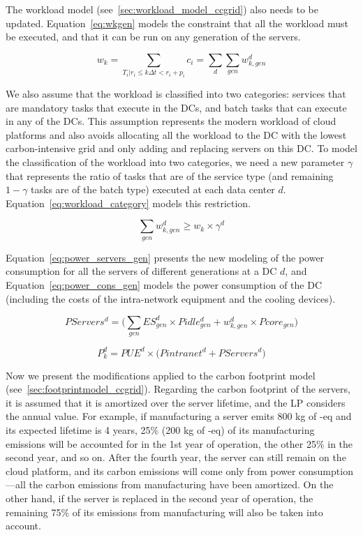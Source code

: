 The workload model (see~\ref{sec:workload_model_ccgrid}) also needs to be updated. Equation~\eqref{eq:wkgen} models the constraint that all the workload must be executed, and that it can be run on any generation of the servers.

\begin{equation} \label{eq:wkgen}
    w_k = \sum_{T_i|r_i\leq k\Delta t<r_i+p_i} c_i = \sum_d \sum_{gen} w_{k,gen}^d
\end{equation}

We also assume that the workload is classified into two categories: services that are mandatory tasks that execute in the DCs, and batch tasks that can execute in any of the DCs. This assumption represents the modern workload of cloud platforms and also avoids allocating all the workload to the DC with the lowest carbon-intensive grid and only adding and replacing servers on this DC. To model the classification of the workload into two categories, we need a new parameter $\gamma$ that represents the ratio of tasks that are of the service type (and remaining $1 - \gamma$ tasks are of the batch type) executed at each data center $d$. Equation~\eqref{eq:workload_category} models this restriction.

\begin{equation} \label{eq:workload_category}
 \sum_{gen}  w_{k,gen}^d \geq  w_k \times \gamma^d
\end{equation}


Equation~\eqref{eq:power_servers_gen} presents the new modeling of the power consumption for all the servers of different generations at a DC $d$, and Equation~\eqref{eq:power_cons_gen} models the power consumption of the DC (including the costs of the intra-network equipment and the cooling devices).


\begin{equation} \label{eq:power_servers_gen}
   PServers^d  =  \big(\sum_{gen} ES_{gen}^d \times  Pidle_{gen}^d + w^d_{k,gen}  \times  Pcore_{gen} \big)
\end{equation}


\begin{equation} \label{eq:power_cons_gen}
   P^d_k  = PUE^d \times \big(Pintranet^d + PServers^d\big)
\end{equation}

Now we present the modifications applied to the carbon footprint model (see~\ref{sec:footprintmodel_ccgrid}). Regarding the carbon footprint of the servers, it is assumed that it is amortized over the server lifetime, and the LP considers the annual value. For example, if manufacturing a server emits 800 kg of -eq and its expected lifetime is 4 years, 25\% (200 kg of -eq) of its manufacturing emissions will be accounted for in the 1st year of operation, the other 25\% in the second year, and so on. After the fourth year, the server can still remain on the cloud platform, and its carbon emissions will come only from power consumption---all the carbon emissions from manufacturing have been amortized. On the other hand, if the server is replaced in the second year of operation, the remaining 75\%  of its emissions from manufacturing will also be taken into account. 

